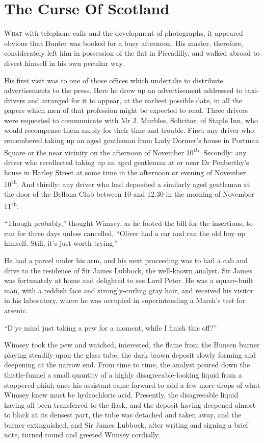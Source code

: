 \chapter{The Curse Of Scotland}

\lettrine[lines=4]{W}{hat} with telephone calls and the development of photographs, it appeared obvious that Bunter was booked for a busy afternoon. His master, therefore, considerately left him in possession of the flat in Piccadilly, and walked abroad to divert himself in his own peculiar way.

His first visit was to one of those offices which undertake to distribute advertisements to the press. Here he drew up an advertisement addressed to taxi-drivers and arranged for it to appear, at the earliest possible date, in all the papers which men of that profession might be expected to read. Three drivers were requested to communicate with Mr J. Murbles, Solicitor, of Staple Inn, who would recompense them amply for their time and trouble. First: any driver who remembered taking up an aged gentleman from Lady Dormer's house in Portman Square or the near vicinity on the afternoon of November  10\textsuperscript{th}. Secondly: any driver who recollected taking up an aged gentleman at or near Dr Penberthy's house in Harley Street at some time in the afternoon or evening of November  10\textsuperscript{th}. And thirdly: any driver who had deposited a similarly aged gentleman at the door of the Bellona Club between 10 and 12.30 in the morning of November  11\textsuperscript{th}.

\enquote{Though probably,} thought Wimsey, as he footed the bill for the insertions, to run for three days unless cancelled, \enquote{Oliver had a car and ran the old boy up himself. Still, it's just worth trying.}

He had a parcel under his arm, and his next proceeding was to hail a cab and drive to the residence of Sir James Lubbock, the well-known analyst. Sir James was fortunately at home and delighted to see Lord Peter. He was a square-built man, with a reddish face and strongly-curling gray hair, and received his visitor in his laboratory, where he was occupied in superintending a Marsh's test for arsenic.

\enquote{D'ye mind just taking a pew for a moment, while I finish this off?}

Wimsey took the pew and watched, interested, the flame from the Bunsen burner playing steadily upon the glass tube, the dark brown deposit slowly forming and deepening at the narrow end. From time to time, the analyst poured down the thistle-funnel a small quantity of a highly disagreeable-looking liquid from a stoppered phial; once his assistant came forward to add a few more drops of what Wimsey knew must be hydrochloric acid. Presently, the disagreeable liquid having all been transferred to the flask, and the deposit having deepened almost to black at its densest part, the tube was detached and taken away, and the burner extinguished, and Sir James Lubbock, after writing and signing a brief note, turned round and greeted Wimsey cordially.

